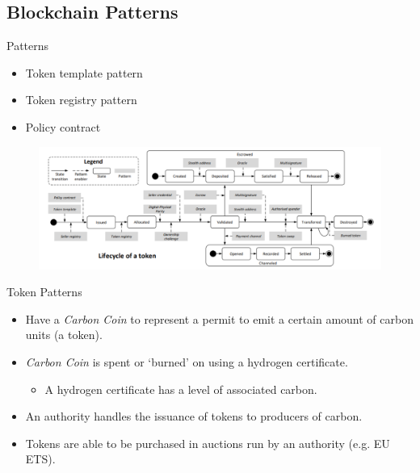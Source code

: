 \subsection{Blockchain Patterns}
\begin{frame}{Patterns}
    \begin{itemize}
        \item Token template pattern
        \item Token registry pattern
        \item Policy contract
    \end{itemize}
    \begin{figure}
        \includegraphics[height=0.5\textheight, width=\linewidth,
            keepaspectratio]{photos/token.png}
        \centering
    \end{figure}
\end{frame}
\begin{frame}{Token Patterns}
    \begin{itemize}
        \item Have a \textit{Carbon Coin} to represent a permit to
              emit a certain amount of carbon units (a token).
        \item \textit{Carbon Coin} is spent or `burned' on using a
              hydrogen certificate.
              \begin{itemize}
                  \item A hydrogen certificate has a level of associated carbon.
              \end{itemize}
        \item An authority handles the issuance of tokens to producers of
              carbon.
        \item Tokens are able to be purchased in auctions run by an
              authority (e.g. EU ETS).
    \end{itemize}
\end{frame}
